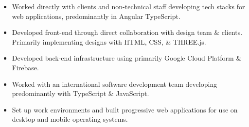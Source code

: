\documentclass[10pt, a4paper]{altacv}
\begin{document}
    \singlespacing
    \begin{fullwidth}
    \makecvheader
    \end{fullwidth}
	\begin{itemize}
		\item Worked directly with clients and non-technical staff developing tech stacks for web applications, predominantly in Angular TypeScript.
		\item Developed front-end through direct collaboration with design team \& clients. Primarily implementing designs with HTML, CSS, \& THREE.js.
		\item Developed back-end infrastructure using primarily Google Cloud Platform \& Firebase.
	\end{itemize}
        \begin{itemize}
        	   \item Worked with an international software development team developing predominantly with TypeScript \& JavaScript.
            \item Set up work environments and built progressive web applications for use on desktop and mobile operating systems.
       \end{itemize}
\end{document}

